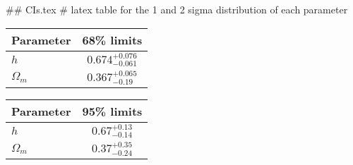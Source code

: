 ## CIs.tex
# latex table for the 1 and 2 sigma distribution of each parameter

\begin{tabular} { l  c}
 Parameter &  68\% limits\\
\hline
{\boldmath$h              $} & $0.674^{+0.076}_{-0.061}   $\\
{\boldmath$\Omega_m       $} & $0.367^{+0.065}_{-0.19}    $\\
\hline
\end{tabular}

\begin{tabular} { l  c}
 Parameter &  95\% limits\\
\hline
{\boldmath$h              $} & $0.67^{+0.13}_{-0.14}      $\\
{\boldmath$\Omega_m       $} & $0.37^{+0.35}_{-0.24}      $\\
\hline
\end{tabular}
